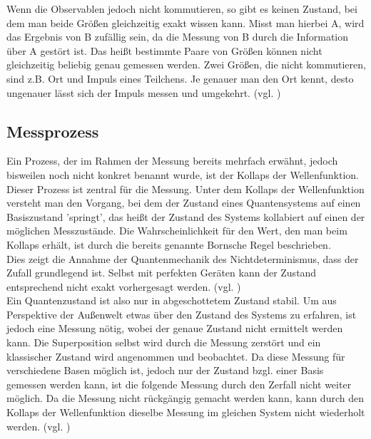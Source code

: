 Wenn die Observablen jedoch nicht kommutieren, so gibt es keinen Zustand, bei dem man beide Größen gleichzeitig exakt wissen kann. Misst man hierbei A, wird das Ergebnis von B zufällig sein, da die Messung von B durch die Information über A gestört ist.
Das heißt bestimmte Paare von Größen können nicht gleichzeitig beliebig genau gemessen werden. 
Zwei Größen, die nicht kommutieren, sind z.B. Ort und Impuls eines Teilchens. Je genauer man den Ort kennt, desto ungenauer lässt sich der Impuls messen und umgekehrt. 
(vgl. \cite[Ch. 1.9.3]{kasirajan_fundamentals_2021})

\subsection{Messprozess}
\label{subsec: Messprozess}

Ein Prozess, der im Rahmen der Messung bereits mehrfach erwähnt, jedoch bisweilen noch nicht konkret benannt wurde, ist der Kollaps der Wellenfunktion. Dieser Prozess ist zentral für die Messung. 
Unter dem Kollaps der Wellenfunktion versteht man den Vorgang, bei dem der Zustand eines Quantensystems auf einen Basiszustand 'springt', das heißt der Zustand des Systems kollabiert auf einen der möglichen Messzustände. Die Wahrscheinlichkeit für den Wert, den man beim Kollaps erhält, ist durch die bereits genannte Bornsche Regel beschrieben. \\
Dies zeigt die Annahme der Quantenmechanik des Nichtdeterminismus, dass der Zufall grundlegend ist. Selbst mit perfekten Geräten kann der Zustand entsprechend nicht exakt vorhergesagt werden. 
(vgl. \cite[Ch. 1.4.1]{lvovsky_quantum_2018})
\\

Ein Quantenzustand ist also nur in abgeschottetem Zustand stabil. Um aus Perspektive der Außenwelt etwas über den Zustand des Systems zu erfahren, ist jedoch eine Messung nötig, wobei der genaue Zustand nicht ermittelt werden kann.
Die Superposition selbst wird durch die Messung zerstört und ein klassischer Zustand wird angenommen und beobachtet. Da diese Messung für verschiedene Basen möglich ist, jedoch nur der Zustand bzgl. einer Basis gemessen werden kann, ist die folgende Messung durch den Zerfall nicht weiter möglich.
Da die Messung nicht rückgängig gemacht werden kann, kann durch den Kollaps der Wellenfunktion dieselbe Messung im gleichen System nicht wiederholt werden.
(vgl. \cite[Ch. 2.8]{homeister_quantum_2022})
\\

